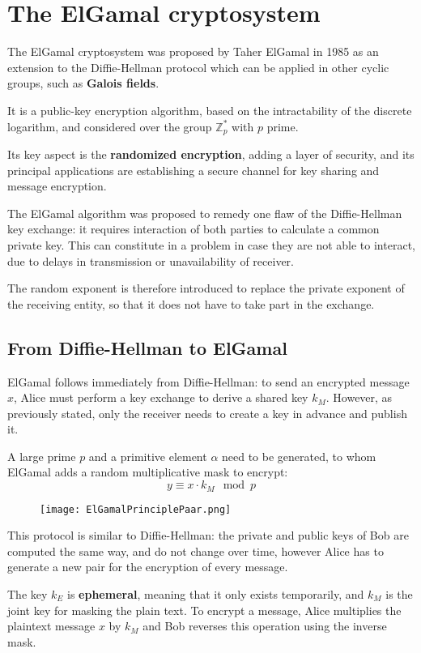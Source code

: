 \section{The ElGamal cryptosystem}
The ElGamal cryptosystem was proposed by Taher ElGamal in 1985 as an extension to the Diffie-Hellman protocol which can be applied in other cyclic groups, such as \textbf{Galois fields}. 

It is a public-key encryption algorithm, based on the intractability of the discrete logarithm, and considered over the group $\mathbb{Z}^*_p$ with $p$ prime.

Its key aspect is the \textbf{randomized encryption}, adding a layer of security, and its principal applications are establishing a secure channel for key sharing and message encryption. 

The ElGamal algorithm was proposed to remedy one flaw of the Diffie-Hellman key exchange: it requires interaction of both parties to calculate a common private key. This can constitute in a problem in case they are not able to interact, due to delays in transmission or unavailability of receiver.

The random exponent is therefore introduced to replace the private exponent of the receiving entity, so that it does not have to take part in the exchange.

\subsection{From Diffie-Hellman to ElGamal}
ElGamal follows immediately from Diffie-Hellman: to send an encrypted message $x$, Alice must perform a key exchange to derive a shared key $k_M$. However, as previously stated, only the receiver needs to create a key in advance and publish it.

A large prime $p$ and a primitive element $\alpha$ need to be generated, to whom ElGamal adds a random multiplicative mask to encrypt:
$$y \equiv x \cdot k_M \mod p$$

\begin{figure}[h]
	\texttt{[image: ElGamalPrinciplePaar.png]}
	\centering
\end{figure}

This protocol is similar to Diffie-Hellman: the private and public keys of Bob are computed the same way, and do not change over time, however Alice has to generate a new pair for the encryption of every message.

The key $k_E$ is \textbf{ephemeral}, meaning that it only exists temporarily, and $k_M$ is the joint key for masking the plain text. To encrypt a message, Alice multiplies the plaintext message $x$ by $k_M$ and Bob reverses this operation using the inverse mask.

